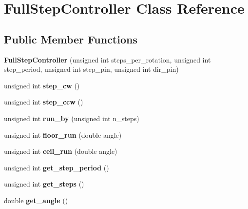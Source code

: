 \hypertarget{classFullStepController}{}\section{Full\+Step\+Controller Class Reference}
\label{classFullStepController}
\subsection*{Public Member Functions}
\begin{DoxyCompactItemize}
\item 
\mbox{\label{classFullStepController_acf4f6bac31f4cf72b16198b09f39600d}} 
{\bfseries Full\+Step\+Controller} (unsigned int steps\+\_\+per\+\_\+rotation, unsigned int step\+\_\+period, unsigned int step\+\_\+pin, unsigned int dir\+\_\+pin)
\item 
\mbox{\label{classFullStepController_a9dcb8326026c99fef86d14c73abfb46a}} 
unsigned int {\bfseries step\+\_\+cw} ()
\item 
\mbox{\label{classFullStepController_a1704b0c470b806ace4d9ceecb0cef8ef}} 
unsigned int {\bfseries step\+\_\+ccw} ()
\item 
\mbox{\label{classFullStepController_a24868fd43d69b51b3189449d11c23dc6}} 
unsigned int {\bfseries run\+\_\+by} (unsigned int n\+\_\+steps)
\item 
\mbox{\label{classFullStepController_a4d17cf50e94538af8e9c1c55f75a2972}} 
unsigned int {\bfseries floor\+\_\+run} (double angle)
\item 
\mbox{\label{classFullStepController_af6315b258390ca186a47a03ed6e961ec}} 
unsigned int {\bfseries ceil\+\_\+run} (double angle)
\item 
\mbox{\label{classFullStepController_ac0d4ed7da3364dfe9bf575a07c7cf9c5}} 
unsigned int {\bfseries get\+\_\+step\+\_\+period} ()
\item 
\mbox{\label{classFullStepController_acc4af90ef8aa84618ebc6c9ba8f5b6eb}} 
unsigned int {\bfseries get\+\_\+steps} ()
\item 
\mbox{\label{classFullStepController_ac0bd6c53a259c542c33783b9246f381a}} 
double {\bfseries get\+\_\+angle} ()
\end{DoxyCompactItemize}
